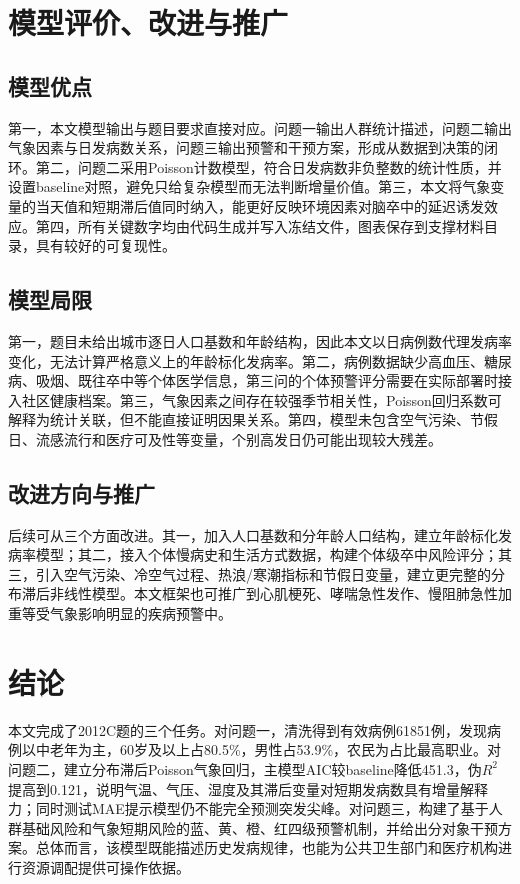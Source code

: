 \documentclass[UTF8,a4paper,12pt]{ctexart}
\begin{document}
\section{模型评价、改进与推广}
\subsection{模型优点}
第一，本文模型输出与题目要求直接对应。问题一输出人群统计描述，问题二输出气象因素与日发病数关系，问题三输出预警和干预方案，形成从数据到决策的闭环。第二，问题二采用Poisson计数模型，符合日发病数非负整数的统计性质，并设置baseline对照，避免只给复杂模型而无法判断增量价值。第三，本文将气象变量的当天值和短期滞后值同时纳入，能更好反映环境因素对脑卒中的延迟诱发效应。第四，所有关键数字均由代码生成并写入冻结文件，图表保存到支撑材料目录，具有较好的可复现性。

\subsection{模型局限}
第一，题目未给出城市逐日人口基数和年龄结构，因此本文以日病例数代理发病率变化，无法计算严格意义上的年龄标化发病率。第二，病例数据缺少高血压、糖尿病、吸烟、既往卒中等个体医学信息，第三问的个体预警评分需要在实际部署时接入社区健康档案。第三，气象因素之间存在较强季节相关性，Poisson回归系数可解释为统计关联，但不能直接证明因果关系。第四，模型未包含空气污染、节假日、流感流行和医疗可及性等变量，个别高发日仍可能出现较大残差。

\subsection{改进方向与推广}
后续可从三个方面改进。其一，加入人口基数和分年龄人口结构，建立年龄标化发病率模型；其二，接入个体慢病史和生活方式数据，构建个体级卒中风险评分；其三，引入空气污染、冷空气过程、热浪/寒潮指标和节假日变量，建立更完整的分布滞后非线性模型。本文框架也可推广到心肌梗死、哮喘急性发作、慢阻肺急性加重等受气象影响明显的疾病预警中。

\section{结论}
本文完成了2012C题的三个任务。对问题一，清洗得到有效病例61851例，发现病例以中老年为主，60岁及以上占80.5\%，男性占53.9\%，农民为占比最高职业。对问题二，建立分布滞后Poisson气象回归，主模型AIC较baseline降低451.3，伪$R^2$提高到0.121，说明气温、气压、湿度及其滞后变量对短期发病数具有增量解释力；同时测试MAE提示模型仍不能完全预测突发尖峰。对问题三，构建了基于人群基础风险和气象短期风险的蓝、黄、橙、红四级预警机制，并给出分对象干预方案。总体而言，该模型既能描述历史发病规律，也能为公共卫生部门和医疗机构进行资源调配提供可操作依据。
\end{document}
